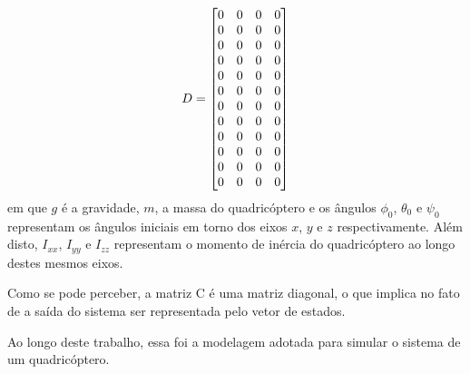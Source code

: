 \begin{equation*}
D =
\left[\begin{array}{@{}*{4}{c}@{}}
	0 & 0 & 0 & 0 \\
	0 & 0 & 0 & 0 \\
	0 & 0 & 0 & 0 \\
	0 & 0 & 0 & 0 \\
	0 & 0 & 0 & 0 \\
	0 & 0 & 0 & 0 \\
	0 & 0 & 0 & 0 \\
	0 & 0 & 0 & 0 \\
	0 & 0 & 0 & 0 \\
	0 & 0 & 0 & 0 \\
	0 & 0 & 0 & 0 \\
	0 & 0 & 0 & 0 \\
\end{array}\right]
\end{equation*}
em que $g$ é a gravidade, $m$, a massa do quadricóptero e os ângulos $\phi_0$, $\theta_0$ e $\psi_0$ representam os ângulos iniciais em torno dos eixos $x$, $y$ e $z$ respectivamente. Além disto, $I_{xx}$, $I_{yy}$ e $I_{zz}$ representam o momento de inércia do quadricóptero ao longo destes mesmos eixos.

Como se pode perceber, a matriz C é uma matriz diagonal, o que implica no fato de a saída do sistema ser representada pelo vetor de estados.

Ao longo deste trabalho, essa foi a modelagem adotada para simular o sistema de um quadricóptero.